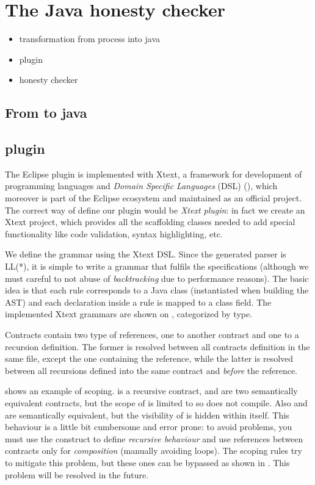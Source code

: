 
\section{The Java honesty checker}\label{sec:java-honesty}

\begin{itemize}
\item transformation from \coco process into java 
\item \coco plugin
\item honesty checker
\end{itemize}


\subsection{From \coco to java }


\subsection{\coco plugin }
The \coco Eclipse plugin is implemented with Xtext, a framework for development of programming languages and \textit{Domain Specific Languages} (DSL) (), which moreover is part of the Eclipse ecosystem and maintained as an official project. The correct way of define our plugin would be \textit{Xtext plugin}: in fact we create an Xtext project, which provides all the scaffolding classes needed to add special functionality like code validation, syntax highlighting, etc.


We define the \coco grammar using the Xtext DSL. Since the generated parser is LL(*), it is simple to write a grammar that fulfils the \coco specifications (although we must careful to not abuse of \textit{backtracking} due to performance reasons). The basic idea is that each rule corresponds to a Java class (instantiated when building the AST) and each declaration inside a rule is mapped to a class field. The implemented Xtext grammars are shown on , categorized by type.

Contracts contain two type of references, one to another contract and one to a recursion definition. The former is resolved between all contracts definition in the same file, except the one containing the reference, while the latter is resolved between all recursions defined into the same contract and \emph{before} the reference.

 shows an example of scoping.  is a recursive contract,  and  are two semantically equivalent contracts, but the scope of  is limited to  so  does not compile.
Also  and  are semantically equivalent, but the visibility of  is hidden within  itself.
%
This behaviour is a little bit cumbersome and error prone: to avoid problems, you must use the  construct to define \textit{recursive behaviour} and use references between contracts only for \textit{composition} (manually avoiding loops). The scoping rules try to mitigate this problem, but these ones can be bypassed as shown in . This problem will be resolved in the future.

